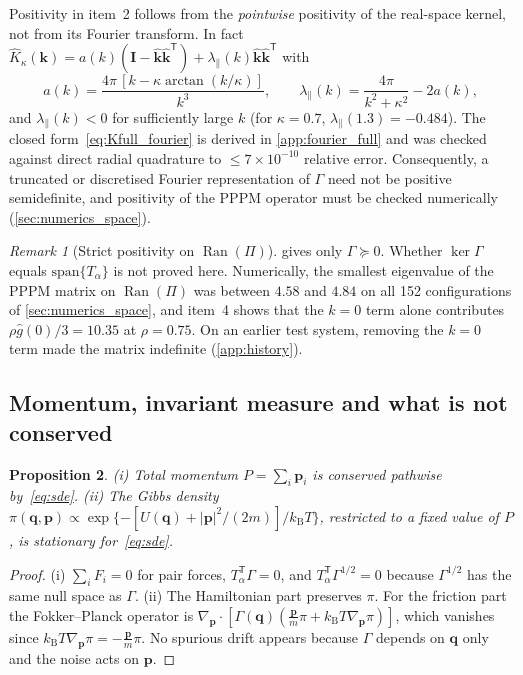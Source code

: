 \documentclass[11pt]{article}
\DeclareRobustCommand{\_}{\textunderscore\allowbreak}
\newtheorem{proposition}{Proposition}[section]
\theoremstyle{remark}
\newtheorem{remark}[proposition]{Remark}
\theoremstyle{definition}
\newcommand{\bq}{\mathbf{q}}
\newcommand{\bp}{\mathbf{p}}
\newcommand{\bk}{\mathbf{k}}
\newcommand{\kh}{\hat{\mathbf{k}}}
\newcommand{\Id}{\mathbf{I}}
\newcommand{\kT}{k_{\mathrm B}T}
\newcommand{\Ran}{\operatorname{Ran}}
\begin{document}
Positivity in item~2 follows from the \emph{pointwise} positivity of the real-space kernel, not from its Fourier
transform. In fact $\hat K_\kappa(\bk)=a(k)(\Id-\kh\kh^{\mathsf T})+\lambda_\parallel(k)\kh\kh^{\mathsf T}$ with
\begin{equation}\label{eq:Kfull_fourier}
a(k)=\frac{4\pi\,[k-\kappa\arctan(k/\kappa)]}{k^3},\qquad
\lambda_\parallel(k)=\frac{4\pi}{k^2+\kappa^2}-2a(k),
\end{equation}
and $\lambda_\parallel(k)<0$ for sufficiently large $k$ (for $\kappa=0.7$, $\lambda_\parallel(1.3)=-0.484$). The
closed form~\eqref{eq:Kfull_fourier} is derived in \cref{app:fourier_full} and was checked against direct radial
quadrature to $\le7\times10^{-10}$ relative error. Consequently, a truncated or discretised Fourier representation of
$\Gamma$ need not be positive semidefinite, and positivity of the PPPM operator must be checked numerically
(\cref{sec:numerics_space}).

\begin{remark}[Strict positivity on $\Ran(\Pi)$]
 gives only $\Gamma\succeq0$. Whether $\ker\Gamma$ equals $\mathrm{span}\{T_\alpha\}$ is not
proved here. Numerically, the smallest eigenvalue of the PPPM matrix on $\Ran(\Pi)$ was between $4.58$ and $4.84$
on all 152 configurations of \cref{sec:numerics_space}, and item~4 shows that the $k=0$ term alone contributes
$\rho\hat g(0)/3=10.35$ at $\rho=0.75$. On an earlier test system, removing the $k=0$ term made the matrix
indefinite (\cref{app:history}).
\end{remark}

\subsection{Momentum, invariant measure and what is not conserved}

\begin{proposition}\label{prop:invariance}
(i) Total momentum $P=\sum_i\bp_i$ is conserved pathwise by~\eqref{eq:sde}. (ii) The Gibbs density
$\pi(\bq,\bp)\propto\exp\{-[U(\bq)+|\bp|^2/(2m)]/\kT\}$, restricted to a fixed value of $P$, is stationary for~\eqref{eq:sde}.
\end{proposition}
\begin{proof}
(i) $\sum_iF_i=0$ for pair forces, $T_\alpha^{\mathsf T}\Gamma=0$, and $T_\alpha^{\mathsf T}\Gamma^{1/2}=0$ because
$\Gamma^{1/2}$ has the same null space as $\Gamma$. (ii) The Hamiltonian part preserves $\pi$. For the friction part
the Fokker--Planck operator is $\nabla_{\bp}\cdot[\Gamma(\bq)(\frac{\bp}{m}\pi+\kT\nabla_{\bp}\pi)]$, which vanishes
since $\kT\nabla_{\bp}\pi=-\frac{\bp}{m}\pi$. No spurious drift appears because $\Gamma$ depends on $\bq$ only and the
noise acts on $\bp$.
\end{proof}
\end{document}
